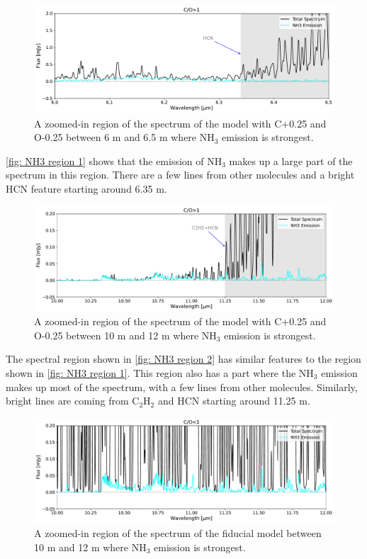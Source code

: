 \documentclass[oneside, single, authoryear, semicolon, 12pt]{lion-msc}
\newcommand{\4}{$_4$}
\newcommand{\3}{$_3$}
\newcommand{\2}{$_2$}
\begin{document}
\begin{figure}[H]
    \centering
    \includegraphics[width=\linewidth]{Figures/NH3_region1.pdf}
    \caption{A zoomed-in region of the spectrum of the model with C+0.25 and O-0.25 between 6 \textmu m and 6.5 \textmu m where NH\3 emission is strongest.}
    \label{fig: NH3 region 1}
\end{figure}

\autoref{fig: NH3 region 1} shows that the emission of NH\3 makes up a large part of the spectrum in this region. There are a few lines from other molecules and a bright HCN feature starting around 6.35 \textmu m.

\begin{figure}[H]
    \centering
    \includegraphics[width=\linewidth]{Figures/NH3_region2.pdf}
    \caption{A zoomed-in region of the spectrum of the model with C+0.25 and O-0.25 between 10 \textmu m and 12 \textmu m where NH\3 emission is strongest.}
    \label{fig: NH3 region 2}
\end{figure}

The spectral region shown in \autoref{fig: NH3 region 2} has similar features to the region shown in \autoref{fig: NH3 region 1}. This region also has a part where the NH\3 emission makes up most of the spectrum, with a few lines from other molecules. Similarly, bright lines are coming from C\2H\2 and HCN starting around 11.25 \textmu m.

\begin{figure}[H]
    \centering
    \includegraphics[width=\linewidth]{Figures/NH3_region3.pdf}
    \caption{A zoomed-in region of the spectrum of the fiducial model between 10 \textmu m and 12 \textmu m where NH\3 emission is strongest.}
    \label{fig: NH3 region 3}
\end{figure}
\end{document}
